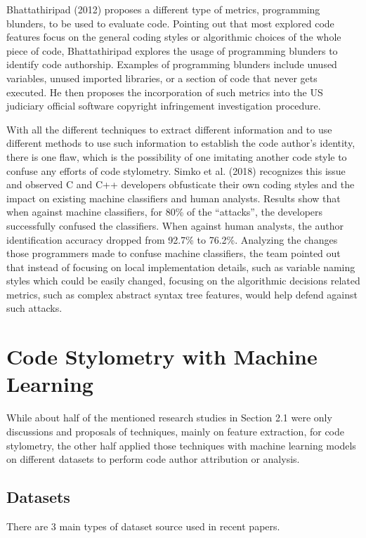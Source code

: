 \documentclass{report}
\begin{document}
Bhattathiripad (2012) proposes a different type of metrics, programming blunders, to be used to evaluate code. Pointing out that most explored code features focus on the general coding styles or algorithmic choices of the whole piece of code, Bhattathiripad explores the usage of programming blunders to identify code authorship. Examples of programming blunders include unused variables, unused imported libraries, or a section of code that never gets executed. He then proposes the incorporation of such metrics into the US judiciary official software copyright infringement investigation procedure.

With all the different techniques to extract different information and to use different methods to use such information to establish the code author’s identity, there is one flaw, which is the possibility of one imitating another code style to confuse any efforts of code stylometry. Simko et al. (2018) recognizes this issue and observed C and C++ developers obfusticate their own coding styles and the impact on existing machine classifiers and human analysts. Results show that when against machine classifiers, for 80\% of the “attacks”, the developers successfully confused the classifiers. When against human analysts, the author identification accuracy dropped from 92.7\% to 76.2\%. Analyzing the changes those programmers made to confuse machine classifiers, the team pointed out that instead of focusing on local implementation details, such as variable naming styles which could be easily changed, focusing on the algorithmic decisions related metrics, such as complex abstract syntax tree features, would help defend against such attacks.

\section{Code Stylometry with Machine Learning}

While about half of the mentioned research studies in Section 2.1 were only discussions and proposals of techniques, mainly on feature extraction, for code stylometry, the other half applied those techniques with machine learning models on different datasets to perform code author attribution or analysis.

\subsection{Datasets}

There are 3 main types of dataset source used in recent papers.
\end{document}

